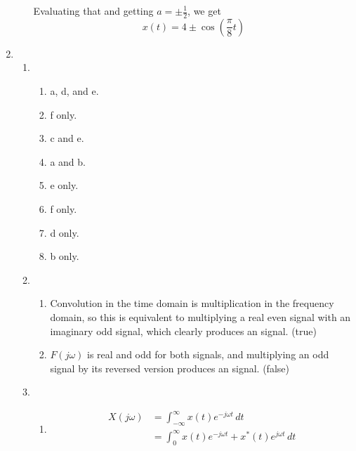 \documentclass[12pt]{article}
\begin{document}
\begin{enumerate}
\begin{enumerate}
                        Evaluating that and getting $a=\pm \frac{1}{2}$, we get \[x(t)=4\pm\cos\left(\frac{\pi}{8}t\right)\]
            \end{enumerate}
      \item \begin{enumerate}
                  \item \begin{enumerate}
                              \item a, d, and e.
                              \item f only.
                              \item c and e.
                              \item a and b.
                              \item e only.
                              \item f only.
                              \item d only.
                              \item b only.
                        \end{enumerate}
                  \item \begin{enumerate}
                              \item Convolution in the time domain is multiplication in the frequency domain,
                                    so this is equivalent to multiplying a real even signal with an imaginary odd signal,
                                    which clearly produces an  signal. (true)
                              \item $F(j\omega)$ is real and odd for both signals,
                                    and multiplying an odd signal by its reversed version
                                    produces an  signal. (false)
                        \end{enumerate}
                  \item \begin{enumerate}
                              \item \[\begin{aligned}
                                                X(j\omega)
                                                 & = \int_{-\infty}^{\infty} x(t)e^{-j\omega t}\,dt                             \\
                                                 & = \int_{0}^{\infty} x(t)e^{-j\omega t}+x^*(t)e^{j\omega t}\,dt               \\

\end{aligned}\]
\end{enumerate}
\end{enumerate}
\end{enumerate}
\end{document}
